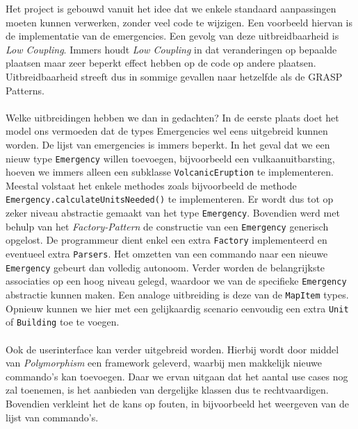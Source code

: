 \label{uitbreidbaarheid}
Het project is gebouwd vanuit het idee dat we enkele standaard aanpassingen moeten kunnen verwerken, zonder veel code te wijzigen. Een voorbeeld hiervan is de implementatie van de emergencies. Een gevolg van deze uitbreidbaarheid is \textit{Low Coupling}. Immers houdt \textit{Low Coupling} in dat veranderingen op bepaalde plaatsen maar zeer beperkt effect hebben op de code op andere plaatsen. Uitbreidbaarheid streeft dus in sommige gevallen naar hetzelfde als de GRASP Patterns.
\paragraph{}
Welke uitbreidingen hebben we dan in gedachten? In de eerste plaats doet het model ons vermoeden dat de types Emergencies wel eens uitgebreid kunnen worden. De lijst van emergencies is immers beperkt. In het geval dat we een nieuw type \texttt{Emergency} willen toevoegen, bijvoorbeeld een vulkaanuitbarsting, hoeven we immers alleen een subklasse \texttt{VolcanicEruption} te implementeren. Meestal volstaat het enkele methodes zoals bijvoorbeeld de methode \texttt{Emergency.calculateUnitsNeeded()} te implementeren. Er wordt dus tot op zeker niveau abstractie gemaakt van het type \texttt{Emergency}. Bovendien werd met behulp van het \textit{Factory-Pattern} de constructie van een \verb+Emergency+ generisch opgelost. De programmeur dient enkel een extra \verb+Factory+ implementeerd en eventueel extra \verb+Parsers+. Het omzetten van een commando naar een nieuwe \verb+Emergency+ gebeurt dan volledig autonoom. Verder worden de belangrijkste associaties op een hoog niveau gelegd, waardoor we van de specifieke \verb+Emergency+ abstractie kunnen maken. Een analoge uitbreiding is deze van de \texttt{MapItem} types. Opnieuw kunnen we hier met een gelijkaardig scenario eenvoudig een extra \texttt{Unit} of \texttt{Building} toe te voegen.
\paragraph{}
Ook de userinterface kan verder uitgebreid worden. Hierbij wordt door middel van \textit{Polymorphism} een framework geleverd, waarbij men makkelijk nieuwe commando's kan toevoegen. Daar we ervan uitgaan dat het aantal use cases nog zal toenemen, is het aanbieden van dergelijke klassen dus te rechtvaardigen. Bovendien verkleint het de kans op fouten, in bijvoorbeeld het weergeven van de lijst van commando's.
